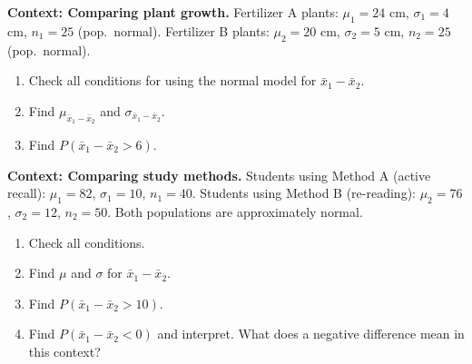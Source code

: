 \documentclass[10pt]{article}
\begin{document}
\namepartnerperiod

\vspace{0.1in}

\begin{tcolorbox}[colback=redbg, colframe=black!40, boxrule=0.6pt, arc=2mm,
    left=3mm, right=3mm, top=2mm, bottom=2mm, title=\textbf{Tier R --- Remediate}]
\textbf{Context: Comparing plant growth.}
Fertilizer A plants: $\mu_1 = 24$ cm, $\sigma_1 = 4$ cm, $n_1 = 25$ (pop.\ normal).
Fertilizer B plants: $\mu_2 = 20$ cm, $\sigma_2 = 5$ cm, $n_2 = 25$ (pop.\ normal).

\begin{enumerate}
  \item Check all conditions for using the normal model for $\bar{x}_1 - \bar{x}_2$.
  \item Find $\mu_{\bar{x}_1-\bar{x}_2}$ and $\sigma_{\bar{x}_1-\bar{x}_2}$.
        \vspace{0.6in}
  \item Find $P(\bar{x}_1 - \bar{x}_2 > 6)$.
        \vspace{0.8in}
\end{enumerate}
\end{tcolorbox}

\vspace{0.12in}

\begin{tcolorbox}[colback=redbg, colframe=black!40, boxrule=0.6pt, arc=2mm,
    left=3mm, right=3mm, top=2mm, bottom=2mm, title=\textbf{Tier A --- Approaching Proficiency}]
\textbf{Context: Comparing study methods.}
Students using Method A (active recall): $\mu_1 = 82$, $\sigma_1 = 10$, $n_1 = 40$.
Students using Method B (re-reading): $\mu_2 = 76$, $\sigma_2 = 12$, $n_2 = 50$.
Both populations are approximately normal.

\begin{enumerate}
  \item Check all conditions.
  \item Find $\mu$ and $\sigma$ for $\bar{x}_1 - \bar{x}_2$.
        \vspace{0.5in}
  \item Find $P(\bar{x}_1 - \bar{x}_2 > 10)$.
        \vspace{0.8in}
  \item Find $P(\bar{x}_1 - \bar{x}_2 < 0)$ and interpret. What does a negative difference
        mean in this context?
        \vspace{0.9in}
\end{enumerate}
\end{tcolorbox}
\end{document}
